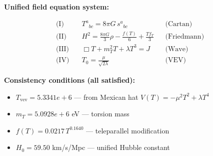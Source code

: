 
\textbf{Unified field equation system:}

\begin{align}
  \text{(I)} \quad & T^a{}_{bc} = 8\pi G \, s^a{}_{bc} && \text{(Cartan)} \\
  \text{(II)} \quad & H^2 = \frac{8\pi G}{3}\rho - \frac{f(T)}{6} + \frac{Tf_T}{3} && \text{(Friedmann)} \\
  \text{(III)} \quad & \Box T + m_T^2 T + \lambda T^3 = J && \text{(Wave)} \\
  \text{(IV)} \quad & T_0 = \frac{\mu}{\sqrt{2\lambda}} && \text{(VEV)}
\end{align}

\textbf{Consistency conditions (all satisfied):}
\begin{itemize}
  \item $T_{\text{vev}} = 5.3341e+6$ — from Mexican hat $V(T) = -\mu^2 T^2 + \lambda T^4$
  \item $m_T = 5.0928e+6$ eV — torsion mass
  \item $f(T) = 0.0217 \, T^{0.1640}$ — teleparallel modification
  \item $H_0 = 59.50$ km/s/Mpc — unified Hubble constant
\end{itemize}